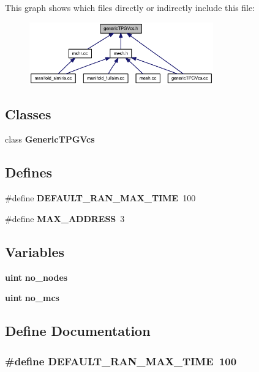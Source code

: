 This graph shows which files directly or indirectly include this file:\nopagebreak
\begin{figure}[H]
\begin{center}
\leavevmode
\includegraphics[width=225pt]{genericTPGVcs_8h__dep__incl}
\end{center}
\end{figure}
\subsection*{Classes}
\begin{CompactItemize}
\item 
class {\bf GenericTPGVcs}
\end{CompactItemize}
\subsection*{Defines}
\begin{CompactItemize}
\item 
\#define {\bf DEFAULT\_\-RAN\_\-MAX\_\-TIME}~100
\item 
\#define {\bf MAX\_\-ADDRESS}~3
\end{CompactItemize}
\subsection*{Variables}
\begin{CompactItemize}
\item 
{\bf uint} {\bf no\_\-nodes}
\item 
{\bf uint} {\bf no\_\-mcs}
\end{CompactItemize}


\subsection{Define Documentation}
\subsubsection[{DEFAULT\_\-RAN\_\-MAX\_\-TIME}]{\setlength{\rightskip}{0pt plus 5cm}\#define DEFAULT\_\-RAN\_\-MAX\_\-TIME~100}\label{genericTPGVcs_8h_95a6218d50e244f6e58b6cca098c1d65}




